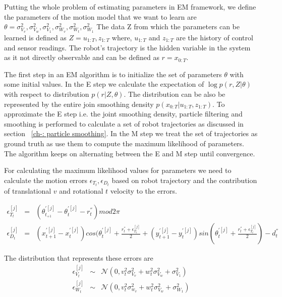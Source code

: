 \documentclass[12pt,draft]{dalcsthesis}
\begin{document}
Putting the whole problem of estimating parameters in EM framework, we define the parameters of the motion model that we want to learn are
$\theta={\sigma_{V_{v}}^{2},\sigma_{V_{w}}^{2},\sigma_{V_{1}}^{2},\sigma_{W_{v}}^{2},\sigma_{W_{t}}^{2},\sigma_{W_{1}}^{2}}$
The data Z from which the parameters can be learned is defined as $Z={u_{1:T},z_{1:T}}$
where, $u_{1:T}$ and $z_{1:T}$ are the history of control and sensor readings. The robot's trajectory is the hidden variable in the system as it not directly observable and can be defined as $r=x_{0:T}$.

The first step in an EM algorithm is to initialize the set of parameters $\theta$ with some initial values. In the E step we calculate the expectation of $\log p(r,Z|\theta)$ with respect to distribution $p(r|Z,\theta)$. The distribution can be also be represented by the entire join smoothing density $p(x_{0:T}|u_{1:T},z_{1:T})$. To approximate the E step i.e. the joint smoothing density, particle filtering and smoothing is performed to calculate a set of robot trajectories as discussed in section ~\ref{ch-: particle smoothing}. In the M step we treat the set of trajectories as ground truth as use them to compute the maximum likelihood of parameters. The algorithm keeps on alternating between the E and M step until convergence. 

For calculating the maximum likelihood values for parameters we need to calculate the motion errors $\epsilon_{T_{t}},\epsilon_{D_{t}}$ based on robot trajectory and the contribution of translational $v$ and rotational $t$ velocity to the errors.

\begin{eqnarray}
\epsilon_{T_{t}}^{[j]}&=&(\theta_{t_{+1}}^{'[j]}-\theta_{t}^{'[j]}-r_{t}^{''})mod2\pi\\
\epsilon_{D_{t}}^{[j]}&=&(x_{t+1}^{'[j]}-x_{t}^{'[j]})cos(\theta_{t}^{'[j]}+\frac{r_{t}^{''}+\epsilon_{T_{t}}^{[j]}}{2}+(y_{t+1}^{'[j]}-y_{t}^{'[j]})sin(\theta_{t}^{'[j]}+\frac{r_{t}^{''}+\epsilon_{T_{t}}^{[j]}}{2})-d_{t}^{''}
\end{eqnarray}

The distribution that represents these errors are 
\begin{eqnarray}
\epsilon_{V_{t}}^{[j]}&\sim&\mathcal{{N}}(0,v_{t}^{2}\sigma_{V_{v}}^{2}+w_{t}^{2}\sigma_{V_{w}}^{2}+\sigma_{V_{1}}^{2})\\
\epsilon_{W_{t}}^{[j]}&\sim&\mathcal{{N}}(0,v_{t}^{2}\sigma_{w_{v}}^{2}+w_{t}^{2}\sigma_{V_{w}}^{2}+\sigma_{W_{1}}^{2})
\end{eqnarray}
\end{document}
